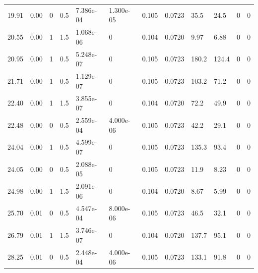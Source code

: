\documentclass[preview]{standalone}
\begin{document}
{{\begin{tabular}{L{1.2cm}C{1.2cm} C{0.3cm}C{0.5cm} C{1.4cm}C{1.4cm} C{1.4cm}C{1.4cm} C{1.6cm}C{1.6cm} C{1.6cm}C{1.6cm}}
  19.91  &  0.00  & 0     & 0.5 &  7.386e-04  & 1.300e-05  &  0.105&   0.0723& 35.5 & 24.5   &  0 & 0  \\ 
  20.55  &  0.00  & 1     & 1.5 &  1.068e-06  & 0  &  0.104&   0.0720& 9.97 & 6.88   &  0 & 0  \\ 
  20.95  &  0.00  & 1     & 0.5 &  5.248e-07  & 0  &  0.105&   0.0723& 180.2 & 124.4   &  0 & 0  \\ 
  21.71  &  0.00  & 1     & 0.5 &  1.129e-07  & 0  &  0.105&   0.0723& 103.2 & 71.2   &  0 & 0  \\ 
  22.40  &  0.00  & 1     & 1.5 &  3.855e-07  & 0  &  0.104&   0.0720& 72.2 & 49.9   &  0 & 0  \\ 
  22.48  &  0.00  & 0     & 0.5 &  2.559e-04  & 4.000e-06  &  0.105&   0.0723& 42.2 & 29.1   &  0 & 0  \\ 
  24.04  &  0.00  & 1     & 0.5 &  4.599e-07  & 0  &  0.105&   0.0723& 135.3 & 93.4   &  0 & 0  \\ 
  24.05  &  0.00  & 0     & 0.5 &  2.088e-05  & 0  &  0.105&   0.0723& 11.9 & 8.23   &  0 & 0  \\ 
  24.98  &  0.00  & 1     & 1.5 &  2.091e-06  & 0  &  0.104&   0.0720& 8.67 & 5.99   &  0 & 0  \\ 
  25.70  &  0.01  & 0     & 0.5 &  4.547e-04  & 8.000e-06  &  0.105&   0.0723& 46.5 & 32.1   &  0 & 0  \\ 
  26.79  &  0.01  & 1     & 1.5 &  3.746e-07  & 0  &  0.104&   0.0720& 137.7 & 95.1   &  0 & 0  \\ 
  28.25  &  0.01  & 0     & 0.5 &  2.448e-04  & 4.000e-06  &  0.105&   0.0723& 133.1 & 91.8   &  0 & 0  \\ 
\hline 
\end{tabular} 

}}
\end{document}
